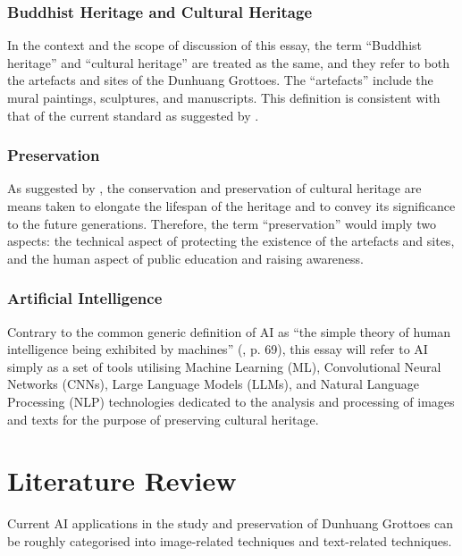 \subsubsection{Buddhist Heritage and Cultural Heritage}

In the context and the scope of discussion of this essay, the term ``Buddhist heritage'' and ``cultural
heritage'' are treated as the same, and they refer to both the artefacts and sites of the Dunhuang Grottoes.
The ``artefacts'' include the mural paintings, sculptures, and manuscripts.
This definition is consistent with that of the current standard as suggested by
.

\subsubsection{Preservation}
\label{sec:preservation-definition}

As suggested by , the conservation and preservation of cultural heritage
are means taken to elongate the lifespan of the heritage and to convey its significance to the future
generations. Therefore, the term ``preservation'' would imply two aspects: the technical aspect of 
protecting the existence of the artefacts and sites, and the human aspect of public education and raising
awareness.

\subsubsection{Artificial Intelligence}

Contrary to the common generic definition of AI as ``the simple theory of human intelligence being
exhibited by machines'' (, p. 69), this essay will refer to AI simply
as a set of tools utilising Machine Learning (ML), Convolutional Neural Networks (CNNs), Large
Language Models (LLMs), and Natural Language Processing (NLP) technologies
dedicated to the analysis and processing of images and texts for the purpose of
preserving cultural heritage.

\section{Literature Review}

Current AI applications in the study and preservation of Dunhuang Grottoes can be roughly categorised into
image-related techniques and text-related techniques.

